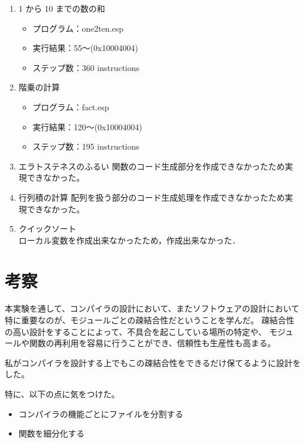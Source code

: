 \documentclass[11pt,a4j]{jarticle}
\begin{document}
\begin{enumerate}
\item {1 から 10 までの数の和 }
  \begin{itemize}
  \item
    プログラム：one2ten.esp
  \item
    実行結果：55〜(0x10004004)
  \item
    ステップ数：360 instructions 
  \end{itemize}
\item {階乗の計算}
  \begin{itemize}
  \item
    プログラム：fact.esp
  \item
    実行結果：120〜(0x10004004) %
  \item
    ステップ数：195 instructions %
  \end{itemize}
\item {エラトステネスのふるい}
  関数のコード生成部分を作成できなかったため実現できなかった。
\item {行列積の計算}
  配列を扱う部分のコード生成処理を作成できなかったため実現できなかった。
\item {クイックソート}\\
  ローカル変数を作成出来なかったため，作成出来なかった．
\end{enumerate}



\section{考察}

本実験を通して、コンパイラの設計において、またソフトウェアの設計において
特に重要なのが、モジュールごとの疎結合性だということを学んだ。
疎結合性の高い設計をすることによって、不具合を起こしている場所の特定や、
モジュールや関数の再利用を容易に行うことができ、信頼性も生産性も高まる。

私がコンパイラを設計する上でもこの疎結合性をできるだけ保てるように設計をした。

特に、以下の点に気をつけた。

\begin{itemize}
    \item コンパイラの機能ごとにファイルを分割する
    \item 関数を細分化する
\end{itemize}
\end{document}
